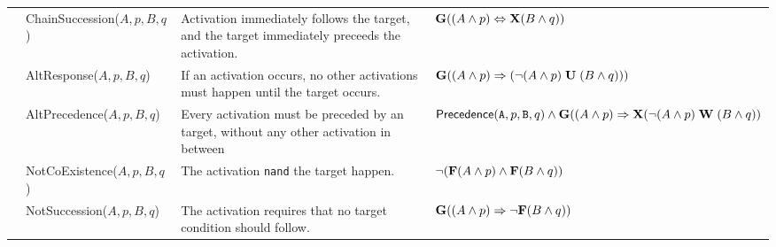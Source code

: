 \begin{table}[!t]
{\begin{tabular}{c|l|p{9cm}|l}
	 & \textsf{ChainSuccession($A,p,B,q$) }  & Activation immediately follows the target, and the target immediately preceeds the activation. & $\mathbf{G}((A\wedge p)\Leftrightarrow\mathbf{X}(B\wedge q))$\\
	 & \textsf{AltResponse($A,p,B,q$) }  & If an activation occurs, no other activations must happen until the target occurs.  & $\mathbf{G}((A\wedge p)\Rightarrow({\neg(A\wedge p)}\;\mathbf{U}\;{(B\wedge q)}))$\\
	 & \textsf{AltPrecedence($A,p,B,q$) }  & Every activation must be preceded by an target, without any other
	 activation in between &   $\textsf{Precedence}(\texttt{A},p,\texttt{B},q)\wedge \mathbf{G}((A\wedge p)\Rightarrow \mathbf{X}({\neg(A\wedge p)}\;\mathbf{W}\;{(B\wedge q)})$\\
	 \midrule
	 
	 \parbox[t]{2mm}{} & \textsf{NotCoExistence($A,p,B,q$) } & The activation \texttt{nand} the target happen.&  $\neg(\mathbf{F}(A\wedge p)\wedge\mathbf{F}(B\wedge q))$\\
	 & \textsf{NotSuccession($A,p,B,q$)} & The activation requires that no target condition should follow.& $\mathbf{G}((A\wedge p)\Rightarrow \neg\mathbf{F}(B\wedge q))$ \\
	 \bottomrule
\end{tabular}}
\end{table} 


